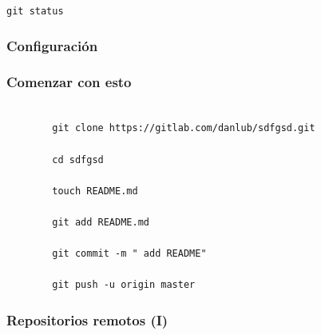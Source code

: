 \documentclass{beamer}
\begin{document}
\begin{frame}
	\begin{block}{\texttt{git status}}
		
	\end{block}
\end{frame}

\begin{frame}\frametitle{Configuración}
\end{frame}

\begin{frame}\frametitle{Comenzar con esto}
	\begin{verbatim}

		git clone https://gitlab.com/danlub/sdfgsd.git

		cd sdfgsd

		touch README.md

		git add README.md

		git commit -m " add README"

		git push -u origin master

	\end{verbatim}
\end{frame}


\begin{frame}\frametitle{Repositorios remotos (I)}


\end{frame}
\end{document}
